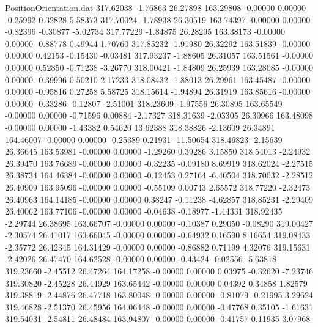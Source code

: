 \begin{filecontents}{PositionOrientation.dat}
 317.62038   -1.76863   26.27898   163.29808   -0.00000    0.00000   -0.25992    0.32828    5.58373
 317.70024   -1.78938   26.30519   163.74397   -0.00000    0.00000   -0.82396   -0.30877   -5.02734
 317.77229   -1.84875   26.28295   163.38173   -0.00000    0.00000   -0.88778    0.49944    1.70760
 317.85232   -1.91980   26.32292   163.51839   -0.00000    0.00000    0.42153   -0.15430   -0.03481
 317.93237   -1.88605   26.31057   163.51561   -0.00000    0.00000    0.52850   -0.71238   -3.26770
 318.00421   -1.84809   26.25939   163.28085   -0.00000    0.00000   -0.39996    0.50210    2.17233
 318.08432   -1.88013   26.29961   163.45487   -0.00000    0.00000   -0.95816    0.27258    5.58725
 318.15614   -1.94894   26.31919   163.85616   -0.00000    0.00000   -0.33286   -0.12807   -2.51001
 318.23609   -1.97556   26.30895   163.65549   -0.00000    0.00000   -0.71596    0.00884   -2.17327
 318.31639   -2.03305   26.30966   163.48098   -0.00000    0.00000   -1.43382    0.54620   13.62388
 318.38826   -2.13609   26.34891   164.46007   -0.00000    0.00000   -0.25389    0.21931  -11.50654
 318.46823   -2.15639   26.36645   163.53981   -0.00000    0.00000   -1.29260    0.39286    3.15850
 318.54013   -2.24932   26.39470   163.76689   -0.00000    0.00000   -0.32235   -0.09180    8.69919
 318.62024   -2.27515   26.38734   164.46384   -0.00000    0.00000   -0.12453    0.27164   -6.40504
 318.70032   -2.28512   26.40909   163.95096   -0.00000    0.00000   -0.55109    0.00743    2.65572
 318.77220   -2.32473   26.40963   164.14185   -0.00000    0.00000    0.38247   -0.11238   -4.62857
 318.85231   -2.29409   26.40062   163.77106   -0.00000    0.00000   -0.04638   -0.18977   -1.44331
 318.92435   -2.29744   26.38695   163.66707   -0.00000    0.00000   -0.10387    0.29050   -0.08290
 319.00427   -2.30574   26.41017   163.66045   -0.00000    0.00000   -0.64932    0.16590    8.16654
 319.08433   -2.35772   26.42345   164.31429   -0.00000    0.00000   -0.86882    0.71199    4.32076
 319.15631   -2.42026   26.47470   164.62528   -0.00000    0.00000   -0.43424   -0.02556   -5.63818
 319.23660   -2.45512   26.47264   164.17258   -0.00000    0.00000    0.03975   -0.32620   -7.23746
 319.30820   -2.45228   26.44929   163.65442   -0.00000    0.00000    0.04392    0.34858    1.82579
 319.38819   -2.44876   26.47718   163.80048   -0.00000    0.00000   -0.81079   -0.21995    3.29624
 319.46828   -2.51370   26.45956   164.06448   -0.00000    0.00000   -0.47768    0.35105   -1.61631
 319.54031   -2.54811   26.48484   163.94807   -0.00000    0.00000   -0.41757    0.11935    3.07968

\end{filecontents}

